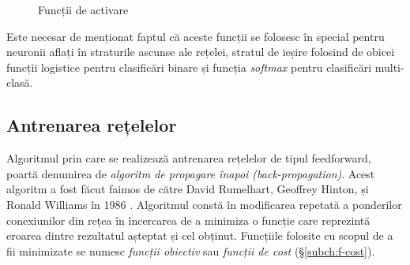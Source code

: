 \begin{figure}[ht]
\qquad
{}
\caption{Funcții de activare}\label{fig:sig+step+tanh+relu}
\end{figure}
Este necesar de menționat faptul că aceste funcții se folosesc în special pentru neuronii aflați în straturile ascunse ale rețelei, stratul de ieșire folosind de obicei funcții logistice pentru clasificări binare și funcția \textit{softmax} pentru clasificări multi-clasă.

\subsection{Antrenarea rețelelor}\label{subch:antrenare}
Algoritmul prin care se realizează antrenarea rețelelor de tipul feedforward, poartă denumirea de \textit{algoritm de propagare înapoi (back-propagation)}. Acest algoritm a fost făcut faimos de către David Rumelhart, Geoffrey Hinton, și Ronald Williams în 1986 \cite{rumelhart1986}. Algoritmul constă în modificarea repetată a ponderilor conexiunilor din rețea în încercarea de a minimiza o funcție care reprezintă eroarea dintre rezultatul așteptat și cel obținut. Funcțiile folosite cu scopul de a fii minimizate se numesc \textit{funcții obiectiv} sau \textit{funcții de cost} (\S\ref{subch:f-cost}).

